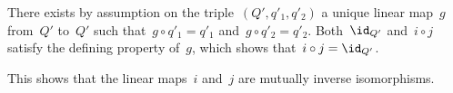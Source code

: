 There exists by assumption on the triple~$(Q', q'_1, q'_2)$ a unique linear map~$g$ from~$Q'$ to~$Q'$ such that~$g \circ q'_1 = q'_1$ and~$g \circ q'_2 = q'_2$.
Both~$\id_{Q'}$ and~$i \circ j$ satisfy the defining property of~$g$, which shows that~$i \circ j = \id_{Q'}$.

This shows that the linear maps~$i$ and~$j$ are mutually inverse isomorphisms.








